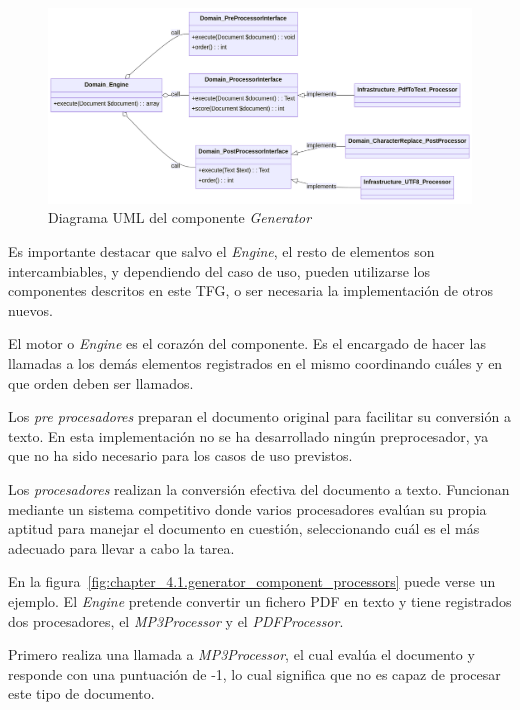 \begin{figure}[ht]
    \begin{center}
        \includegraphics[width=\textwidth]{./chapter/4/images/chapter_4.1.generator_component_uml}
        \caption{Diagrama UML del componente \textit{Generator}}
        \label{fig:chapter_4.1.generator_component_uml}
    \end{center}
\end{figure}

Es importante destacar que salvo el \textit{Engine}, el resto de elementos son intercambiables, y dependiendo del caso
de uso, pueden utilizarse los componentes descritos en este TFG, o ser necesaria la implementación de otros nuevos.

El motor o \textit{Engine} es el corazón del componente.
Es el encargado de hacer las llamadas a los demás elementos registrados en el mismo coordinando cuáles y en que
orden deben ser llamados.

Los \textit{pre procesadores} preparan el documento original para facilitar su conversión a texto.
En esta implementación no se ha desarrollado ningún preprocesador, ya que no ha sido necesario para los casos de uso
previstos.

Los \textit{procesadores} realizan la conversión efectiva del documento a texto.
Funcionan mediante un sistema competitivo donde varios procesadores evalúan su propia aptitud para manejar el documento
en cuestión, seleccionando cuál es el más adecuado para llevar a cabo la tarea.

En la figura~\ref{fig:chapter_4.1.generator_component_processors} puede verse un ejemplo.
El \textit{Engine} pretende convertir un fichero PDF en texto y tiene registrados dos procesadores, el
\textit{MP3Processor} y el \textit{PDFProcessor}.

Primero realiza una llamada a \textit{MP3Processor}, el cual evalúa el documento y responde con una puntuación
de -1, lo cual significa que no es capaz de procesar este tipo de documento.

